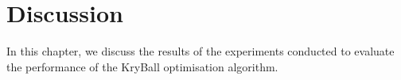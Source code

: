 \chapter{Discussion}
\label{chap:discussion}

In this chapter, we discuss the results of the experiments conducted to evaluate the performance of the KryBall optimisation algorithm.


